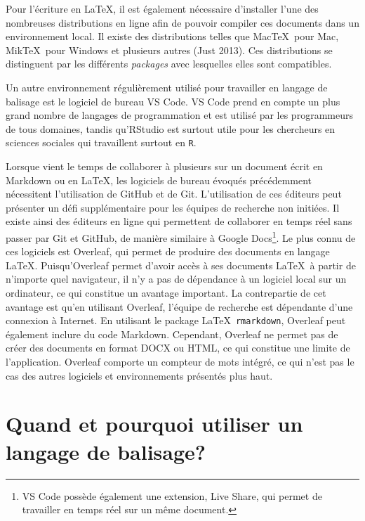 \documentclass[
  letterpaper,
]{scrbook}
\begin{document}
Pour l'écriture en \LaTeX, il est également nécessaire d'installer l'une
des nombreuses distributions en ligne afin de pouvoir compiler ces
documents dans un environnement local. Il existe des distributions
telles que Mac\TeX~pour Mac, Mik\TeX~pour Windows et plusieurs autres
(Just 2013). Ces distributions se distinguent par les différents
\emph{packages} avec lesquelles elles sont compatibles.

Un autre environnement régulièrement utilisé pour travailler en langage
de balisage est le logiciel de bureau VS Code. VS Code prend en compte
un plus grand nombre de langages de programmation et est utilisé par les
programmeurs de tous domaines, tandis qu'RStudio est surtout utile pour
les chercheurs en sciences sociales qui travaillent surtout en
\texttt{R}.

Lorsque vient le temps de collaborer à plusieurs sur un document écrit
en Markdown ou en \LaTeX, les logiciels de bureau évoqués précédemment
nécessitent l'utilisation de GitHub et de Git. L'utilisation de ces
éditeurs peut présenter un défi supplémentaire pour les équipes de
recherche non initiées. Il existe ainsi des éditeurs en ligne qui
permettent de collaborer en temps réel sans passer par Git et GitHub, de
manière similaire à Google Docs\footnote{VS Code possède également une
  extension, Live Share, qui permet de travailler en temps réel sur un
  même document.}. Le plus connu de ces logiciels est Overleaf, qui
permet de produire des documents en langage \LaTeX. Puisqu'Overleaf
permet d'avoir accès à ses documents \LaTeX~à partir de n'importe quel
navigateur, il n'y a pas de dépendance à un logiciel local sur un
ordinateur, ce qui constitue un avantage important. La contrepartie de
cet avantage est qu'en utilisant Overleaf, l'équipe de recherche est
dépendante d'une connexion à Internet. En utilisant le package
\LaTeX~\texttt{rmarkdown}, Overleaf peut également inclure du code
Markdown. Cependant, Overleaf ne permet pas de créer des documents en
format DOCX ou HTML, ce qui constitue une limite de l'application.
Overleaf comporte un compteur de mots intégré, ce qui n'est pas le cas
des autres logiciels et environnements présentés plus haut.

\hypertarget{quand-et-pourquoi-utiliser-un-langage-de-balisage}{%
\section{Quand et pourquoi utiliser un langage de
balisage?}\label{quand-et-pourquoi-utiliser-un-langage-de-balisage}}
\end{document}
